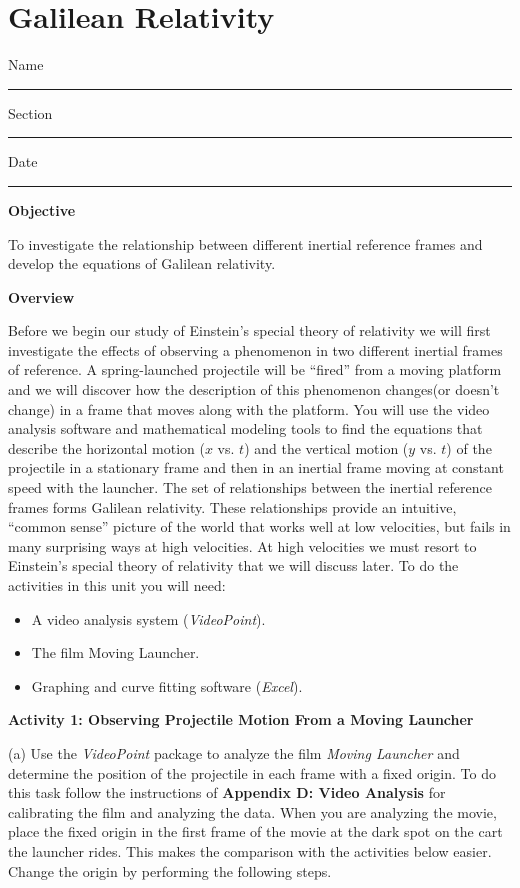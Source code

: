 
\section{Galilean Relativity}

Name \rule{2.0in}{0.1pt}\hfill{}Section \rule{1.0in}{0.1pt}\hfill{}Date
\rule{1.0in}{0.1pt}

\textbf{Objective }

To investigate the relationship between different inertial reference
frames and develop the equations of Galilean relativity.

\textbf{Overview}

Before we begin our study of Einstein's special theory of relativity
we will first investigate the effects of observing a phenomenon in
two different inertial frames of reference. A spring-launched projectile
will be {}``fired'' from a moving platform and we will discover
how the description of this phenomenon changes(or doesn't change)
in a frame that moves along with the platform. You will use the video
analysis software and mathematical modeling tools to find the equations
that describe the horizontal motion ($x$ vs. $t$) and the vertical motion
($y$ vs. $t$) of the projectile in a stationary frame and then in an inertial
frame moving at constant speed with the launcher. The set of relationships
between the inertial reference frames forms Galilean relativity. These
relationships provide an intuitive, {}``common sense'' picture of
the world that works well at low velocities, but fails in many surprising
ways at high velocities. At high velocities we must resort to Einstein's
special theory of relativity that we will discuss later. To do the
activities in this unit you will need:

\begin{itemize}
\item A video analysis system (\emph{VideoPoint}).
\item The film Moving Launcher.
\item Graphing and curve fitting software (\emph{Excel}).
\end{itemize}
\textbf{Activity 1: Observing Projectile Motion From a Moving Launcher}

(a) Use the \emph{VideoPoint} package to analyze the film \emph{Moving
Launcher} and determine the position of the projectile in each frame
with a fixed origin. To do this task follow the instructions of \textbf{Appendix
D: Video Analysis} for calibrating the film and analyzing the data.
When you are analyzing the movie, place the fixed origin in the first
frame of the movie at the dark spot on the cart the launcher rides.
This makes the comparison with the activities below easier. Change
the origin by performing the following steps.

